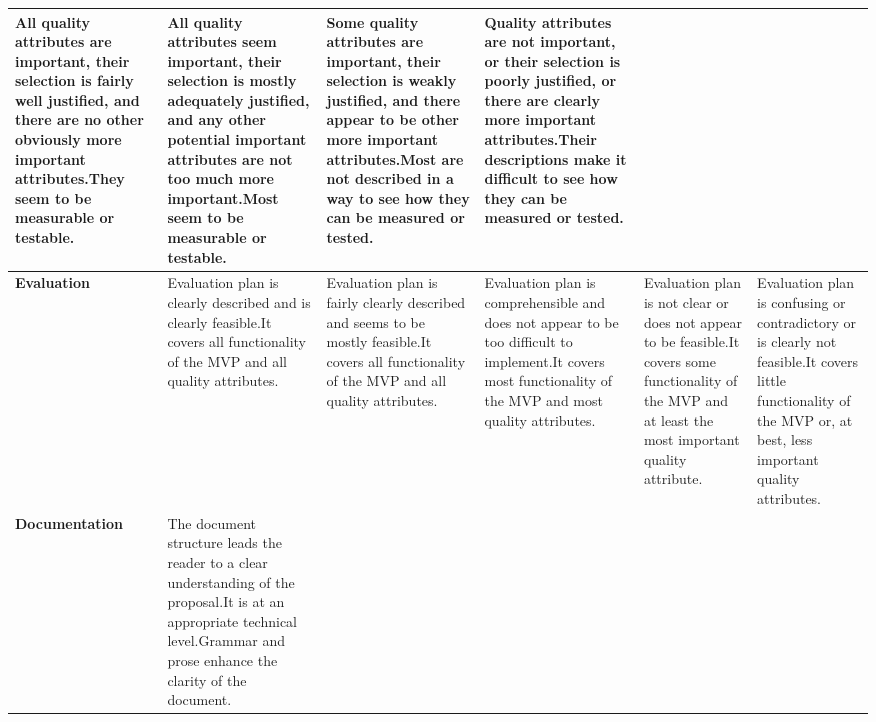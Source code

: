 \documentclass{csse4400}
\begin{document}
\begin{landscape}
\begin{adjustwidth}{-5mm}{-5mm}
\begin{xltabular}{\linewidth}{| p{2cm} | X | X | X | X | X |}
All quality attributes are important, their selection is fairly well justified, and there are no other obviously more important attributes.\newline\newline They seem to be measurable or testable. &
All quality attributes seem important, their selection is mostly adequately justified, and any other potential important attributes are not too much more important.\newline\newline Most seem to be measurable or testable. &
Some quality attributes are important, their selection is weakly justified, and there appear to be other more important attributes.\newline\newline Most are not described in a way to see how they can be measured or tested. &
Quality attributes are not important, or their selection is poorly justified, or there are clearly more important attributes.\newline\newline Their descriptions make it difficult to see how they can be measured or tested. \\
\hline
\textbf{Evaluation} &
Evaluation plan is clearly described and is clearly feasible.\newline\newline It covers all functionality of the MVP and all quality attributes. &
Evaluation plan is fairly clearly described and seems to be mostly feasible.\newline\newline It covers all functionality of the MVP and all quality attributes. &
Evaluation plan is comprehensible and does not appear to be too difficult to implement.\newline\newline It covers most functionality of the MVP and most quality attributes. &
Evaluation plan is not clear or does not appear to be feasible.\newline\newline It covers some functionality of the MVP and at least the most important quality attribute. &
Evaluation plan is confusing or contradictory or is clearly not feasible.\newline\newline It covers little functionality of the MVP or, at best, less important quality attributes. \\
\hline
\textbf{Documentation} &
The document structure leads the reader to a clear understanding of the proposal.\newline\newline It is at an appropriate technical level.\newline\newline Grammar and prose enhance the clarity of the document. &

\end{xltabular}
\end{adjustwidth}
\end{landscape}
\end{document}

